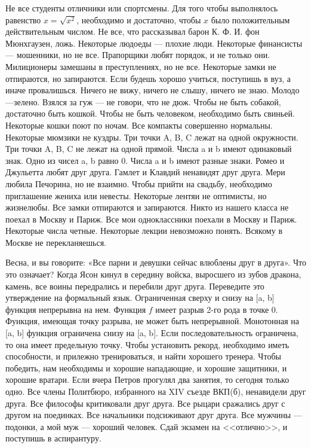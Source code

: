 \z Не все студенты отличники или спортсмены.
\z Для того чтобы выполнялось равенство $x = \sqrt{x^2}$, необходимо и достаточно, чтобы $x$ было положительным действительным числом.
\z Не все, что рассказывал барон К. Ф. И. фон Мюнхгаузен, ложь.
\z Некоторые людоеды — плохие люди.
\z Некоторые финансисты — мошенники, но не все.
\z Прапорщики любят порядок, и не только они.
\z Милиционеры замешаны в преступлениях, но не все.
\z Некоторые замки не отпираются, но запираются.
\z Если будешь хорошо учиться, поступишь в вуз, а иначе
провалишься.
\z Ничего не вижу, ничего не слышу, ничего не знаю.
\z Молодо—зелено.
\z Взялся за гуж --- не говори, что не дюж.
\z Чтобы не быть собакой, достаточно быть кошкой.
\z Чтобы не быть человеком, необходимо быть свиньей.
\z Некоторые кошки поют по ночам.
\z Все компакты совершенно нормальны.
\z Некоторые мюмзики не куздры.
\z Три точки A, B, C лежат на одной окружности.
\z Три точки A, B, C не лежат на одной прямой.
\z Числа a и b имеют одинаковый знак.
\z Одно из чисел a, b равно 0.
\z Числа a и b имеют разные знаки.
\z Ромео и Джульетта любят друг друга.
\z Гамлет и Клавдий ненавидят друг друга.
\z Мери любила Печорина, но не взаимно.
\z Чтобы прийти на свадьбу, необходимо приглашение жениха или невесты.
\z Некоторые лентяи не оптимисты, но жизнелюбы.
\z Все замки отпираются и запираются.
\z Никто из нашего класса не поехал в Москву и Париж.
\z Все мои одноклассники поехали в Москву и Париж.
\z Некоторые числа четные.
\z Некоторые лекции невозможно понять.
\z Всякому в Москве не перекланяешься.


\z Весна, и вы говорите: «Все парни и девушки сейчас влюблены друг в друга». Что это означает?
\z Когда Ясон кинул в середину войска, выросшего из зубов дракона, камень, все воины передрались и перебили друг друга.
Переведите это утверждение на формальный язык.
\z Ограниченная сверху и снизу на [a, b] функция непрерывна на нем.
\z Функция $f$ имеет разрыв 2-го рода в точке 0.
\z Функция, имеющая точку разрыва, не может быть непрерывной.
\z Монотонная на [a, b] функция ограничена снизу на [a, b].
\z Если последовательность ограничена, то она имеет предельную точку.
\z Чтобы установить рекорд, необходимо иметь способности, и прилежно тренироваться, и найти хорошего тренера.
\z Чтобы победить, нам необходимы и хорошие нападающие, и хорошие защитники, и хорошие вратари.
\z Если вчера Петров прогулял два занятия, то сегодня только одно.
\z Все члены Политбюро, избранного на XIV съезде ВКП(б), ненавидели друг друга.
\z Все философы критиковали друг друга.
\z Все рыцари сражались друг с другом на поединках.
\z Все начальники подсиживают друг друга.
\z Все мужчины --- подонки, а мой муж --- хороший человек.
\z Сдай экзамен на <<отлично>>, и поступишь в аспирантуру.
